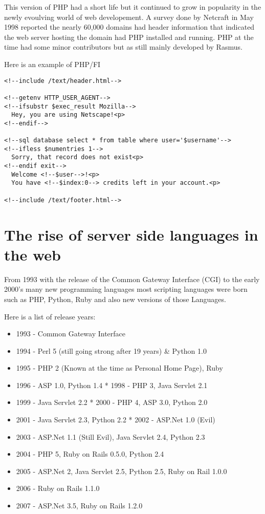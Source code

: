 \documentclass{book}
\begin{document}
This version of PHP had a short life but it continued to grow in popularity in the newly evoulving world of web developement. A survey done by Netcraft in May 1998 reported the nearly 60,000 domains had header information that indicated the web server hosting the domain had PHP installed and running. PHP at the time had some minor contributors but as still mainly developed by Rasmus. 

Here is an example of PHP/FI
\lstset{language=HTML}
\begin{lstlisting}[frame=single]
<!--include /text/header.html-->

<!--getenv HTTP_USER_AGENT-->
<!--ifsubstr $exec_result Mozilla-->
  Hey, you are using Netscape!<p>
<!--endif-->

<!--sql database select * from table where user='$username'-->
<!--ifless $numentries 1-->
  Sorry, that record does not exist<p>
<!--endif exit-->
  Welcome <!--$user-->!<p>
  You have <!--$index:0--> credits left in your account.<p>

<!--include /text/footer.html-->
\end{lstlisting}



\chapter{The rise of server side languages in the web}
From 1993 with the release of the Common Gateway Interface (CGI) to the early 2000's many new programming languages most scripting languages were born such as PHP, Python, Ruby and also new versions of those Languages.

Here is a list of release years\cite{royal-pingdom}: 

\begin{itemize}
\item 1993 - Common Gateway Interface 
\item 1994 - Perl 5 (still going strong after 19 years) \& Python 1.0 
\item 1995 - PHP 2 (Known at the time as Personal Home Page), Ruby 
\item 1996 - ASP 1.0, Python 1.4 * 1998 - PHP 3, Java Servlet 2.1 
\item 1999 - Java Servlet 2.2 * 2000 - PHP 4, ASP 3.0, Python 2.0
\item 2001 - Java Servlet 2.3, Python 2.2 * 2002 - ASP.Net 1.0 (Evil)
\item 2003 - ASP.Net 1.1 (Still Evil), Java Servlet 2.4, Python 2.3 
\item 2004 - PHP 5, Ruby on Rails 0.5.0, Python 2.4 
\item 2005 - ASP.Net 2, Java Servlet 2.5, Python 2.5, Ruby on Rail 1.0.0 
\item 2006 - Ruby on Rails 1.1.0
\item 2007 - ASP.Net 3.5, Ruby on Rails 1.2.0
\end{itemize}
\end{document}
